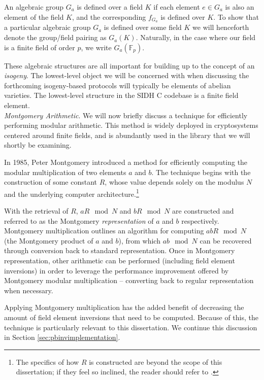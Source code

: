 An algebraic group $G_a$ is defined over a field $K$ if each element $e \in G_a$ is also an element of the field $K$, and the corresponding $f_{G_a}$ is defined over $K$. To show that a particular algebraic group $G_a$ is defined over some field $K$ we will henceforth denote the group/field pairing as $G_a(K)$. Naturally, in the case where our field is a finite field of order $p$, we write $G_a(\mathbb{F}_p)$.

These algebraic structures are all important for building up to the concept of an \emph{isogeny}. The lowest-level object we will be concerned with when discussing the forthcoming isogeny-based protocols will typically be elements of abelian varieties. The lowest-level structure in the SIDH C codebase is a finite field element.\\

\noindent
\emph{Montgomery Arithmetic}\label{snip:montgomery}. We will now briefly discuss a technique for efficiently performing modular arithmetic. This method is widely deployed in cryptosystems centered around finite fields, and is abundantly used in the \sidh library that we will shortly be examining.

In 1985, Peter Montgomery introduced a method for efficiently computing the modular multiplication of two elements $a$ and $b$. The technique begins with the construction of some constant $R$, whose value depends solely on the modulus $N$ and the underlying computer architecture.\footnote{The specifics of how $R$ is constructed are beyond the scope of this dissertation; if they feel so inclined, the reader should refer to \cite{mont}.}

With the retrieval of $R$, $aR \mod{N}$ and $bR \mod{N}$ are constructed and referred to as the Montgomery \emph{representation} of $a$ and $b$ respectively. Montgomery multiplication outlines an algorithm for computing $abR \mod{N}$ (the Montgomery product of $a$ and $b$), from which $ab \mod{N}$ can be recovered through conversion back to standard representation. Once in Montgomery representation, other arithmetic can be performed (including field element inversions) in order to leverage the performance improvement offered by Montgomery modular multiplication -- converting back to regular representation when necessary.

Applying Montgomery multiplication has the added benefit of decreasing the amount of field element inversions that need to be computed. Because of this, the technique is particularly relevant to this dissertation. We continue this discussion in Section \ref{sec:pbinvimplementation}.

